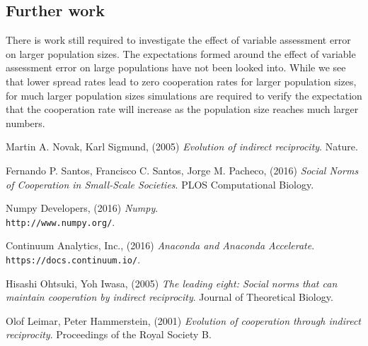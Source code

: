 \documentclass[10pt,a4paper]{article}
\begin{document}
\subsection{Further work}
There is work still required to investigate the effect of variable assessment error on larger population sizes.
The expectations formed around the effect of variable assessment error on large populations have not been looked into.
While we see that lower spread rates lead to zero cooperation rates for larger population sizes, for much larger population sizes simulations are required to verify the expectation that the cooperation rate will increase as the population size reaches much larger numbers.

\pagebreak
\begin{thebibliography}{9}

Martin A. Novak, Karl Sigmund, (2005) 
\textit{Evolution of indirect reciprocity}. 
Nature.

Fernando P. Santos, Francisco C. Santos, Jorge M. Pacheco, (2016) 
\textit{Social Norms of Cooperation in Small-Scale Societies}. 
PLOS Computational Biology.

Numpy Developers, (2016) 
\textit{Numpy}. 
\\\texttt{http://www.numpy.org/}.

Continuum Analytics, Inc., (2016) 
\textit{Anaconda and Anaconda Accelerate}. 
\\\texttt{https://docs.continuum.io/}.

Hisashi Ohtsuki, Yoh Iwasa, (2005) 
\textit{The leading eight: Social norms that can maintain cooperation by indirect reciprocity}. 
Journal of Theoretical Biology.

Olof Leimar, Peter Hammerstein, (2001) 
\textit{Evolution of cooperation through indirect reciprocity}. 
Proceedings of the Royal Society B.

\end{thebibliography}
\end{document}
